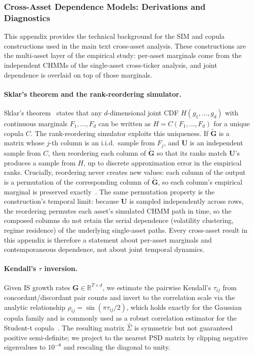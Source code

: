 \subsubsection{Cross-Asset Dependence Models: Derivations and Diagnostics}
\label{sec:cross_asset_supp}

This appendix provides the technical background for the SIM and copula constructions used in the main text cross-asset analysis. These constructions are the multi-asset layer of the empirical study: per-asset marginals come from the independent CHMMs of the single-asset cross-ticker analysis, and joint dependence is overlaid on top of those marginals.

\paragraph{Sklar's theorem and the rank-reordering simulator.}
Sklar's theorem~\cite{sklar1959fonctions, nelsen2006introduction} states that any $d$-dimensional joint CDF $H(g_1, \dots, g_d)$ with continuous marginals $F_1, \dots, F_d$ can be written as $H = C(F_1, \dots, F_d)$ for a unique copula $C$.
The rank-reordering simulator exploits this uniqueness.
If $\tilde{\mathbf{G}}$ is a matrix whose $j$-th column is an i.i.d.\ sample from $F_j$, and $\mathbf{U}$ is an independent sample from $C$, then reordering each column of $\tilde{\mathbf{G}}$ so that its ranks match $\mathbf{U}$'s produces a sample from $H$, up to discrete approximation error in the empirical ranks.
Crucially, reordering never creates new values: each column of the output is a permutation of the corresponding column of $\tilde{\mathbf{G}}$, so each column's empirical marginal is preserved exactly~\cite{iman1982distribution}. The same permutation property is the construction's temporal limit: because $\mathbf{U}$ is sampled independently across rows, the reordering permutes each asset's simulated CHMM path in time, so the composed columns do not retain the serial dependence (volatility clustering, regime residence) of the underlying single-asset paths. Every cross-asset result in this appendix is therefore a statement about per-asset marginals and contemporaneous dependence, not about joint temporal dynamics.

\paragraph{Kendall's $\tau$ inversion.}
Given IS growth rates $\mathbf{G} \in \mathbb{R}^{T \times d}$, we estimate the pairwise Kendall's $\tau_{ij}$ from concordant/discordant pair counts and invert to the correlation scale via the analytic relationship $\rho_{ij} = \sin(\pi \tau_{ij} / 2)$, which holds exactly for the Gaussian copula family and is commonly used as a robust correlation estimator for the Student-t copula~\cite{embrechts2002correlation, mcneil2015quantitative}.
The resulting matrix $\hat{\Sigma}$ is symmetric but not guaranteed positive semi-definite; we project to the nearest PSD matrix by clipping negative eigenvalues to $10^{-8}$ and rescaling the diagonal to unity.

